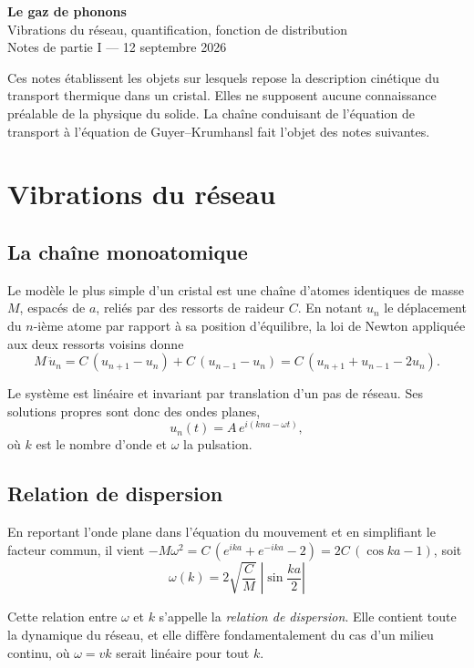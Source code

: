 \documentclass[11pt,a4paper]{article}
\begin{document}
\begin{center}
{\Large\bfseries Le gaz de phonons}\\[4pt]
{\normalsize Vibrations du réseau, quantification, fonction de distribution}\\[2pt]
{\small Notes de partie I --- 12 septembre 2026}
\end{center}

\vspace{4pt}


Ces notes établissent les objets sur lesquels repose la description cinétique du transport
thermique dans un cristal. Elles ne supposent aucune connaissance préalable de la physique du
solide. La chaîne conduisant de l'équation de transport à l'équation de Guyer--Krumhansl fait
l'objet des notes suivantes.

\section{Vibrations du réseau}

\subsection{La chaîne monoatomique}

Le modèle le plus simple d'un cristal est une chaîne d'atomes identiques de masse $M$, espacés de
$a$, reliés par des ressorts de raideur $C$. En notant $u_n$ le déplacement du $n$-ième atome par
rapport à sa position d'équilibre, la loi de Newton appliquée aux deux ressorts voisins donne
\[ M\,\ddot{u}_n = C\,(u_{n+1} - u_n) + C\,(u_{n-1} - u_n) = C\,(u_{n+1} + u_{n-1} - 2u_n). \]

Le système est linéaire et invariant par translation d'un pas de réseau. Ses solutions propres sont
donc des ondes planes,
\[ u_n(t) = A\,e^{i(kna - \omega t)} , \]
où $k$ est le nombre d'onde et $\omega$ la pulsation.

\subsection{Relation de dispersion}

En reportant l'onde plane dans l'équation du mouvement et en simplifiant le facteur commun, il
vient $-M\omega^2 = C\,(e^{ika} + e^{-ika} - 2) = 2C\,(\cos ka - 1)$, soit
\[ \boxed{\;\omega(k) = 2\sqrt{\frac{C}{M}}\;\left|\sin\frac{ka}{2}\right|\;} \]

Cette relation entre $\omega$ et $k$ s'appelle la \emph{relation de dispersion}. Elle contient
toute la dynamique du réseau, et elle diffère fondamentalement du cas d'un milieu continu, où
$\omega = vk$ serait linéaire pour tout $k$.
\end{document}
